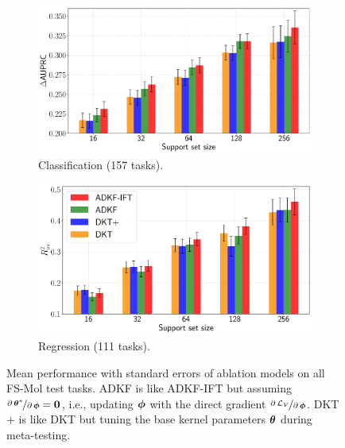         \begin{figure}[ht]
            \centering
            \begin{subfigure}{.45\textwidth}
                \centering
                \includegraphics[width=\textwidth]{comparison_plot_hc_all_ablation.pdf}
                \caption{Classification (157 tasks).}
            \end{subfigure}
            \hfill
            \begin{subfigure}{.45\textwidth}
                \centering
                \includegraphics[width=\textwidth]{comparison_plot_hc_all_ablation_numeric.pdf}
                \caption{Regression (111 tasks).}
            \end{subfigure}
            \caption[Ablation study results on FS-Mol.]{Mean performance with standard errors of ablation models on all FS-Mol test tasks. ADKF is like ADKF-IFT but assuming $\nicefrac{\partial\operatorname{\boldsymbol{\theta}}^*}{\partial\operatorname{\boldsymbol{\phi}}}=\operatorname{\mathbf{0}}$, i.e., updating $\operatorname{\boldsymbol{\phi}}$ with the direct gradient $\nicefrac{\partial \operatorname{\mathcal{L}}_V}{\partial\operatorname{\boldsymbol{\phi}}}$. DKT$+$ is like DKT but tuning the base kernel parameters $\operatorname{\boldsymbol{\theta}}$ during meta-testing.}
            \label{fig:ablation-study}
        \end{figure}
